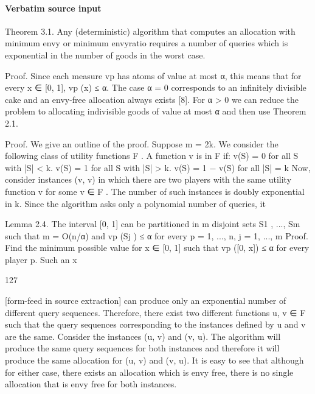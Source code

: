 \documentclass[10pt]{article}
\begin{document}
\paragraph{Verbatim source input}
\begin{ReviewVerbatim}
Theorem 3.1. Any (deterministic) algorithm that computes an allocation with minimum envy or minimum envyratio requires a number of queries which is exponential in
the number of goods in the worst case.

Proof. Since each measure vp has atoms of value at most
α, this means that for every x ∈ [0, 1], vp ({x}) ≤ α. The
case α = 0 corresponds to an infinitely divisible cake and
an envy-free allocation always exists [8]. For α > 0 we can
reduce the problem to allocating indivisible goods of value
at most α and then use Theorem 2.1.

Proof. We give an outline of the proof. Suppose m = 2k.
We consider the following class of utility functions F . A
function v is in F if:
v(S) = 0 for all S with |S| < k.
v(S) = 1 for all S with |S| > k.
v(S) = 1 − v(S̄) for all |S| = k
Now, consider instances (v, v) in which there are two players with the same utility function v for some v ∈ F . The
number of such instances is doubly exponential in k. Since
the algorithm asks only a polynomial number of queries, it

Lemma 2.4. The interval [0, 1] can be partitioned in m
disjoint sets S1 , ..., Sm such that m = O(n/α) and vp (Sj ) ≤
α for every p = 1, ..., n, j = 1, ..., m
Proof. Find the minimum possible value for x ∈ [0, 1]
such that vp ([0, x]) ≤ α for every player p. Such an x

127


[form-feed in source extraction]
can produce only an exponential number of different query
sequences. Therefore, there exist two different functions
u, v ∈ F such that the query sequences corresponding to
the instances defined by u and v are the same.
Consider the instances (u, v) and (v, u). The algorithm
will produce the same query sequences for both instances
and therefore it will produce the same allocation for (u, v)
and (v, u). It is easy to see that although for either case,
there exists an allocation which is envy free, there is no
single allocation that is envy free for both instances.
\end{ReviewVerbatim}
\end{document}

